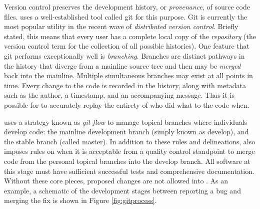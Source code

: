 Version control preserves the development history, or \emph{provenance}, of
source code files. \Cyclus uses a well-established tool called git
\cite{software_freedom_conservancy_git_2014}
for this purpose. Git is currently the most popular utility in the recent wave
of \emph{distributed version control}. Briefly stated, this means that every
user has a complete local copy of the \emph{repository} (the version control
term for the collection of all possible histories).
One feature that git performs exceptionally well is \emph{branching}.
Branches are distinct pathways in the history that diverge from a mainline source
tree and then may be \emph{merged} back into the mainline. Multiple simultaneous
branches may exist at all points in time. Every change to the code is recorded
in the history, along with metadata such as the author, a timestamp, and an
accompanying message. Thus
it is possible for \Cyclus to accurately replay the entirety of who did what to the
code when.

\Cyclus uses a strategy known as \emph{git flow}
\cite{kalliamvakou_code-centric_2014}
to manage topical branches where individuals develop code: the mainline development
branch (simply known as develop), and the stable branch (called master).
In addition to these rules and delineations, \Cyclus also imposes rules on
when it is acceptable from a quality control standpoint to merge code from
the personal topical branches into the develop branch. All software at this stage
must have sufficient successful tests and comprehensive documentation. Without
these core pieces, proposed changes are not allowed into \Cyclus. As an example, a schematic of
the development stages between reporting a bug and merging the fix is shown in
Figure \ref{fig:gitprocess}.

